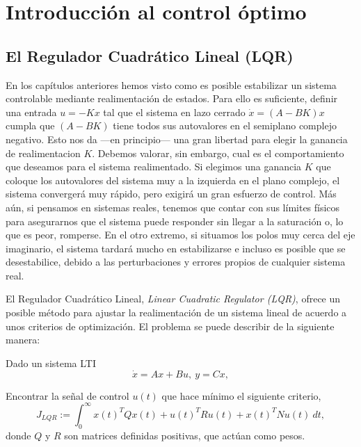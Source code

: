 \chapter{Introducción al control óptimo}
\section{El Regulador Cuadrático Lineal (LQR)}
En los capítulos anteriores hemos visto como es posible estabilizar un sistema controlable mediante realimentación de estados. Para ello es suficiente, definir una entrada $u = -Kx$ tal que el sistema en lazo cerrado $\dot x = (A-BK)x$ cumpla que $(A-BK)$ tiene todos sus autovalores en el semiplano complejo negativo. Esto nos da ---en principio--- una gran libertad para elegir la ganancia de realimentacion $K$. Debemos valorar, sin embargo, cual es el comportamiento que deseamos para el sistema realimentado. Si elegimos una ganancia $K$ que coloque los autovalores del sistema muy a la izquierda en el plano complejo, el sistema convergerá muy rápido, pero exigirá un gran esfuerzo de control. Más aún, si pensamos en sistemas reales, tenemos que contar con sus límites físicos para asegurarnos que el sistema puede responder sin llegar a la saturación o, lo que es peor, romperse. En el otro extremo, si situamos los polos muy cerca del eje imaginario, el sistema tardará mucho en estabilizarse e incluso es posible que se desestabilice, debido a las perturbaciones y errores propios de cualquier sistema real.

El Regulador Cuadrático Lineal, \emph{Linear Cuadratic Regulator (LQR)}, ofrece un posible método para ajustar la realimentación de un sistema lineal de acuerdo a unos criterios de optimización. El problema se puede describir de la siguiente manera:

Dado un sistema LTI
\begin{equation*}
\dot{x} = Ax+Bu,\ y=Cx,
\end{equation*}

Encontrar la señal de control $u(t)$ que hace mínimo el siguiente criterio,
\begin{equation}\label{eq:lqr}
J_{LQR} := \int_0^{\infty}x(t)^TQx(t)+u(t)^TRu(t)+x(t)^TNu(t)\  dt,
\end{equation}
donde $Q$ y $R$ son matrices definidas positivas, que actúan como pesos.

